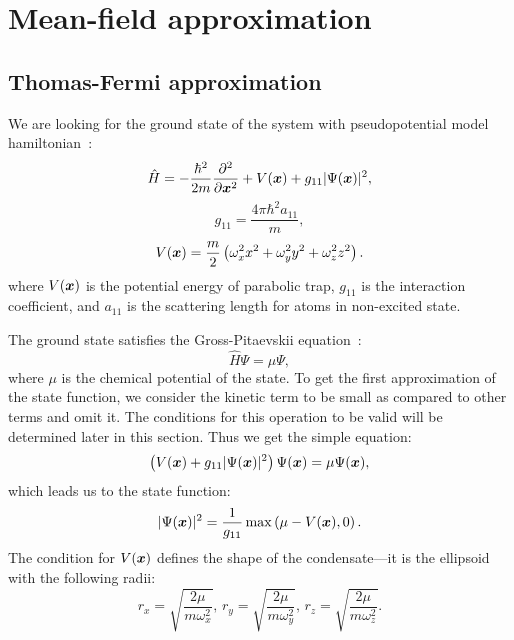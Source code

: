 \chapter{Mean-field approximation}
\label{cha:mean-field}


\section{Thomas-Fermi approximation}

We are looking for the ground state of the system with pseudopotential model hamiltonian~\cite{Pitaevskii2003}:
\[
	\hat{H} =
		- \frac{\hbar^2}{2m} \frac{\partial^2}{\partial \boldsymbol{x}^2}
		+ V(\boldsymbol{x})
		+ g_{11} \lvert \Psi(\boldsymbol{x}) \rvert^2,
\]
\[
	g_{11} = \frac{4 \pi \hbar^2 a_{11}}{m},
\]
\begin{equation}
\label{eqn:mean-field:trap-potential}
	V(\boldsymbol{x}) = \frac{m}{2} \left(
		\omega_x^2 x^2 + \omega_y^2 y^2 + \omega_z^2 z^2
	\right).
\end{equation}
where $V(\boldsymbol{x})$ is the potential energy of parabolic trap, $g_{11}$ is the interaction coefficient,
and $a_{11}$ is the scattering length for atoms in non-excited state.

The ground state satisfies the Gross-Pitaevskii equation~\cite{Pitaevskii2003}:
\begin{equation}
\label{eqn:mean-field:gs-shroedinger}
	\hat{H} \Psi = \mu \Psi,
\end{equation}
where $\mu$ is the chemical potential of the state.
To get the first approximation of the state function,
we consider the kinetic term to be small as compared to other terms and omit it.
The conditions for this operation to be valid will be determined later in this section.
Thus we get the simple equation:
\[
	\left( V(\boldsymbol{x}) + g_{11} \lvert \Psi(\boldsymbol{x}) \rvert^2 \right) \Psi(\boldsymbol{x}) = \mu \Psi(\boldsymbol{x}),
\]
which leads us to the state function:
\begin{equation}
\label{eqn:mean-field:tf-gs}
	\lvert \Psi(\boldsymbol{x}) \rvert^2 = \frac{1}{g_{11}} \max \left( \mu - V(\boldsymbol{x}), 0 \right).
\end{equation}
The condition for $V(\boldsymbol{x})$ defines the shape of the condensate---it is the ellipsoid with the following radii:
\begin{equation}
\label{eqn:mean-field:tf-radii}
	r_x = \sqrt{\frac{2\mu}{m \omega_x^2}},\,
	r_y = \sqrt{\frac{2\mu}{m \omega_y^2}},\,
	r_z = \sqrt{\frac{2\mu}{m \omega_z^2}}.
\end{equation}

